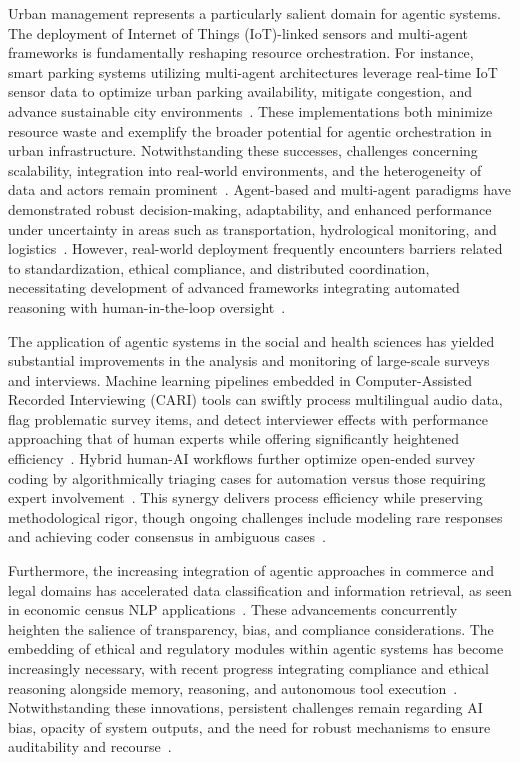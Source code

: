 \documentclass[sigconf]{acmart}
\begin{document}
Urban management represents a particularly salient domain for agentic systems. The deployment of Internet of Things (IoT)-linked sensors and multi-agent frameworks is fundamentally reshaping resource orchestration. For instance, smart parking systems utilizing multi-agent architectures leverage real-time IoT sensor data to optimize urban parking availability, mitigate congestion, and advance sustainable city environments~\cite{ref20}. These implementations both minimize resource waste and exemplify the broader potential for agentic orchestration in urban infrastructure. Notwithstanding these successes, challenges concerning scalability, integration into real-world environments, and the heterogeneity of data and actors remain prominent~\cite{ref20,ref40,ref111,ref113,ref114}. Agent-based and multi-agent paradigms have demonstrated robust decision-making, adaptability, and enhanced performance under uncertainty in areas such as transportation, hydrological monitoring, and logistics~\cite{ref40,ref45,ref91,ref92,ref93,ref111,ref113,ref114}. However, real-world deployment frequently encounters barriers related to standardization, ethical compliance, and distributed coordination, necessitating development of advanced frameworks integrating automated reasoning with human-in-the-loop oversight~\cite{ref30,ref40,ref45,ref58,ref91,ref92,ref93,ref94,ref95,ref96,ref113,ref114,ref115}.

The application of agentic systems in the social and health sciences has yielded substantial improvements in the analysis and monitoring of large-scale surveys and interviews. Machine learning pipelines embedded in Computer-Assisted Recorded Interviewing (CARI) tools can swiftly process multilingual audio data, flag problematic survey items, and detect interviewer effects with performance approaching that of human experts while offering significantly heightened efficiency~\cite{ref27,ref28,ref29,ref97,ref98,ref99,ref100,ref112}. Hybrid human-AI workflows further optimize open-ended survey coding by algorithmically triaging cases for automation versus those requiring expert involvement~\cite{ref27,ref28}. This synergy delivers process efficiency while preserving methodological rigor, though ongoing challenges include modeling rare responses and achieving coder consensus in ambiguous cases~\cite{ref27,ref29,ref97}.

Furthermore, the increasing integration of agentic approaches in commerce and legal domains has accelerated data classification and information retrieval, as seen in economic census NLP applications~\cite{ref26}. These advancements concurrently heighten the salience of transparency, bias, and compliance considerations. The embedding of ethical and regulatory modules within agentic systems has become increasingly necessary, with recent progress integrating compliance and ethical reasoning alongside memory, reasoning, and autonomous tool execution~\cite{ref40,ref109,ref111}. Notwithstanding these innovations, persistent challenges remain regarding AI bias, opacity of system outputs, and the need for robust mechanisms to ensure auditability and recourse~\cite{ref109,ref110,ref112,ref113,ref114,ref115}.
\end{document}

